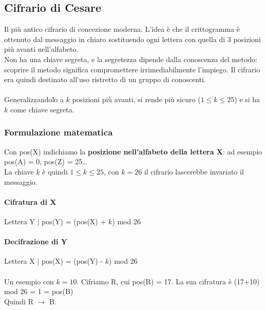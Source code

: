 \documentclass[10pt]{book}
\begin{document}
\subsection{Cifrario di Cesare}
Il più antico cifrario di concezione moderna. L'idea è che il crittogramma è ottenuto dal messaggio in chiaro sostituendo ogni lettera con quella di $3$ posizioni più avanti nell'alfabeto.\\
Non ha una chiave segreta, e la segretezza dipende dalla conoscenza del metodo: scoprire il metodo significa compromettere irrimediabilmente l'impiego. Il cifrario era quindi destinato all'uso ristretto di un gruppo di conoscenti.\\\\
Generalizzandolo a $k$ posizioni più avanti, si rende più sicuro ($1\leq k \leq 25$) e si ha $k$ come chiave segreta.
\subsubsection{Formulazione matematica}
Con pos(X) indichiamo la \textbf{posizione nell'alfabeto della lettera X}: ad esempio pos(A) = 0, pos(Z) = 25\ldots\\
La chiave $k$ è quindi $1 \leq k \leq 25$, con $k=26$ il cifrario lascerebbe invariato il messaggio.
\paragraph{Cifratura di X} Lettera Y $|$ pos(Y) = (pos(X) + $k$) mod 26
\paragraph{Decifrazione di Y} Lettera X $|$ pos(X) = (pos(Y) - $k$) mod 26\\\\
Un esempio con $k=10$. Cifriamo R, cui pos(R) = 17. La sua cifratura è (17+10) mod 26 = 1 = pos(B)\\Quindi R $\rightarrow$ B.
\end{document}
